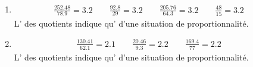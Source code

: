 {\begin{enumerate}
\item\begin{align*}
\frac{252.48}{78.9} = 3.2\qquad \frac{92.8}{29} = 3.2\qquad \frac{205.76}{64.3} = 3.2\qquad \frac{48}{15} = 3.2\qquad 
\end{align*}
L' des quotients indique qu' d'une situation de proportionnalité.

\item\begin{align*}
\frac{130.41}{62.1} = 2.1\qquad \frac{20.46}{9.3} = 2.2\qquad \frac{169.4}{77} = 2.2\qquad 
\end{align*}
L' des quotients indique qu' d'une situation de proportionnalité.

\end{enumerate}}
